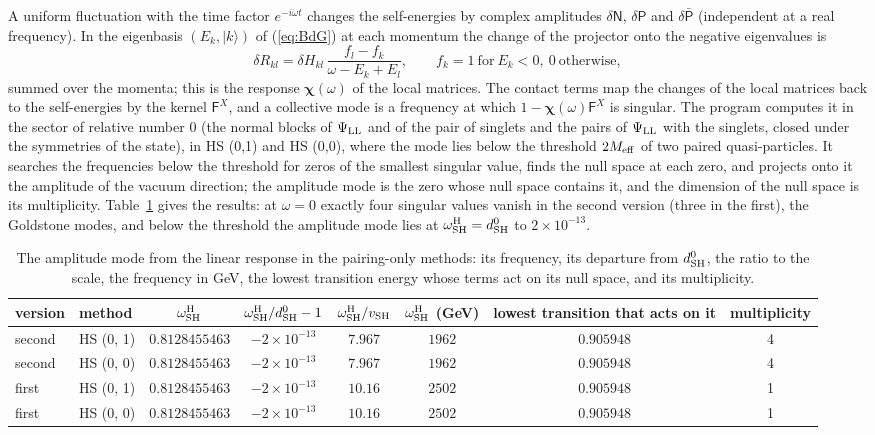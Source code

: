 \documentclass[aps,prd,onecolumn,superscriptaddress,nofootinbib,floatfix,longbibliography]{revtex4-2}
\newcommand{\LL}{{\rm LL}}
\newcommand{\SH}{{\rm SH}}
\begin{document}
A uniform fluctuation with the time factor $e^{-i\omega t}$ changes the self-energies by complex amplitudes $\delta\mathsf N$,
$\delta\mathsf P$ and $\delta\bar{\mathsf P}$ (independent at a real frequency). In the eigenbasis $(E_k,|k\rangle)$ of
(\ref{eq:BdG}) at each momentum the change of the projector onto the negative eigenvalues is
\begin{equation}
\delta R_{kl}=\delta H_{kl}\,\frac{f_l-f_k}{\omega-E_k+E_l},\qquad f_k=1\ \text{for}\ E_k<0,\ 0\ \text{otherwise},
\label{eq:dR}
\end{equation}
summed over the momenta; this is the response $\bm\chi(\omega)$ of the local matrices. The contact terms map the changes of
the local matrices back to the self-energies by the kernel $\mathsf F^X$, and a collective mode is a frequency at which
$1-\bm\chi(\omega)\mathsf F^X$ is singular. The program computes it in the sector of relative number 0 (the normal blocks of
$\Psi_\LL$ and of the pair of singlets and the pairs of $\Psi_\LL$ with the singlets, closed under the symmetries of the
state), in HS (0,1) and HS (0,0), where the mode lies below the threshold $2M_{\rm eff}$ of two paired quasi-particles. It
searches the frequencies below the threshold for zeros of the smallest singular value, finds the null space at each zero,
and projects onto it the amplitude of the vacuum direction; the amplitude mode is the zero whose null space contains it,
and the dimension of the null space is its multiplicity. Table~\ref{tab:rpa} gives the results: at $\omega=0$ exactly
four singular values vanish in the second version (three in the first), the Goldstone modes, and below the threshold the
amplitude mode lies at $\omega^{\rm H}_\SH=d^0_\SH$ to \ensuremath{2\times10^{-13}}.

\begin{table}[!htbp]
\caption{\label{tab:rpa}The amplitude mode from the linear response in the pairing-only methods: its frequency, its departure from $d^0_\SH$, the ratio to the scale, the frequency in GeV, the lowest transition energy whose terms act on its null space, and its multiplicity.}
\begingroup\centering\footnotesize\setlength{\tabcolsep}{4pt}
\begin{tabular}{llcccccc}
\hline\hline
version & method & $\omega^{\rm H}_{\rm SH}$ & $\omega^{\rm H}_{\rm SH}/d^0_{\rm SH}-1$ & $\omega^{\rm H}_{\rm SH}/v_{\rm SH}$ & $\omega^{\rm H}_{\rm SH}$ (GeV) & lowest transition that acts on it & multiplicity \\ \hline
second & HS (0, 1) & $0.8128455463$ & $-2\times10^{-13}$ & $7.967$ & $1962$ & $0.905948$ & 4 \\
second & HS (0, 0) & $0.8128455463$ & $-2\times10^{-13}$ & $7.967$ & $1962$ & $0.905948$ & 4 \\
first & HS (0, 1) & $0.8128455463$ & $-2\times10^{-13}$ & $10.16$ & $2502$ & $0.905948$ & 1 \\
first & HS (0, 0) & $0.8128455463$ & $-2\times10^{-13}$ & $10.16$ & $2502$ & $0.905948$ & 1 \\
\hline\hline
\end{tabular}\par
\endgroup
\end{table}
\end{document}
